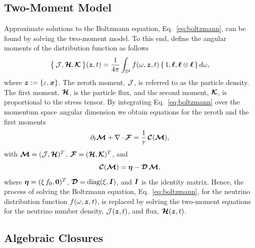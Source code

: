 \subsection{Two-Moment Model}

Approximate solutions to the Boltzmann equation, Eq.~\eqref{eq:boltzmann}, can be found by solving the two-moment model.
To this end, define the angular moments of the distribution function as follows
\begin{equation}
  \big\{\,\mathcal{J},\boldsymbol{\mathcal{H}},\boldsymbol{\mathcal{K}}\,\big\}(\boldsymbol{z},t)
  =\frac{1}{4\pi}\int_{\mathbb{S}^{2}}f(\omega,\boldsymbol{z},t)\,\{\,1,\boldsymbol{\ell},\boldsymbol{\ell}\otimes\boldsymbol{\ell}\,\}\,d\omega,
  \label{eq:angularMoments}
\end{equation}
where $\boldsymbol{z}:=\{\varepsilon,\boldsymbol{x}\}$.  
The zeroth moment, $\mathcal{J}$, is referred to as the particle density.  
The first moment, $\boldsymbol{\mathcal{H}}$, is the particle flux, and the second moment, $\boldsymbol{\mathcal{K}}$, is proportional to the stress tensor.  
By integrating Eq.~\eqref{eq:boltzmann} over the momentum space angular dimension we obtain equations for the zeroth and the first moments
\begin{equation}
  \partial_{t}{\boldsymbol{\mathcal{M}}}+\nabla\cdot\boldsymbol{\mathcal{F}}=\frac{1}{\tau}\,\boldsymbol{\mathcal{C}}(\boldsymbol{\mathcal{M}}),
  \label{eq:momentEquations}
\end{equation}
with $\boldsymbol{\mathcal{M}}=(\mathcal{J},\boldsymbol{\mathcal{H}})^{T}$, $\boldsymbol{\mathcal{F}}=(\boldsymbol{\mathcal{H}},\boldsymbol{\mathcal{K}})^{T}$, and
\begin{equation}
  \boldsymbol{\mathcal{C}}(\boldsymbol{\mathcal{M}})=\boldsymbol{\eta}-\boldsymbol{\mathcal{D}}\,\boldsymbol{\mathcal{M}},
  \label{eq:collisionTermMoments}
\end{equation}
where $\boldsymbol{\eta}=(\xi\,f_{0},\boldsymbol{0})^{T}$, $\boldsymbol{\mathcal{D}}=\mbox{diag}(\xi,\boldsymbol{I})$, and
$\boldsymbol{I}$ is the identity matrix.
Hence, the process of solving the Boltzmann equation, Eq.~\eqref{eq:boltzmann}, for the neutrino distribution function $f(\omega,\boldsymbol{z},t)$, is replaced by solving the two-moment equations for the neutrino number density, $\mathcal{J}(\boldsymbol{z},t)$, and flux, $\boldsymbol{\mathcal{H}}(\boldsymbol{z},t)$.  

\subsection{Algebraic Closures}

